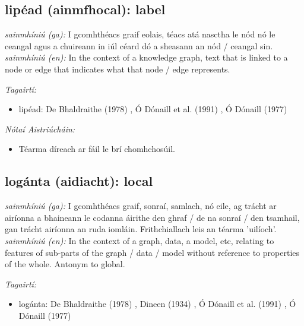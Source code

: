 \documentclass{article}
\begin{document}
\subsection*{lipéad (ainmfhocal): label} 
 \noindent \textit{sainmhíniú (ga):} I gcomhthéacs graif eolais, téacs atá nasctha le nód nó le ceangal agus a chuireann in iúl céard dó a sheasann an nód / ceangal sin.
\newline\newline
 \noindent \textit{sainmhíniú (en):} In the context of a knowledge graph, text that is linked to a node or edge that indicates what that node / edge represents.
\newline

 \noindent \textit{Tagairtí:}
\begin{itemize}
	\item lipéad: De Bhaldraithe (1978) \cite{de-bhaldraithe}, Ó Dónaill et al. (1991) \cite{focloir-beag}, Ó Dónaill (1977) \cite{odonaill}
\end{itemize}

 \noindent \textit{Nótaí Aistriúcháin:}
\begin{itemize}
	\item Téarma díreach ar fáil le brí chomhchosúil.
\end{itemize}


\subsection*{logánta (aidiacht): local} 
 \noindent \textit{sainmhíniú (ga):} I gcomhthéacs graif, sonraí, samlach, nó eile, ag trácht ar airíonna a bhaineann le codanna áirithe den ghraf / de na sonraí / den tsamhail, gan trácht airíonna an ruda iomláin. Frithchiallach leis an téarma 'uilíoch'.
\newline\newline
 \noindent \textit{sainmhíniú (en):} In the context of a graph, data, a model, etc, relating to features of sub-parts of the graph / data / model without reference to properties of the whole. Antonym to global.
\newline

 \noindent \textit{Tagairtí:}
\begin{itemize}
	\item logánta: De Bhaldraithe (1978) \cite{de-bhaldraithe}, Dineen (1934) \cite{dineen}, Ó Dónaill et al. (1991) \cite{focloir-beag}, Ó Dónaill (1977) \cite{odonaill}
\end{itemize}
\end{document}
